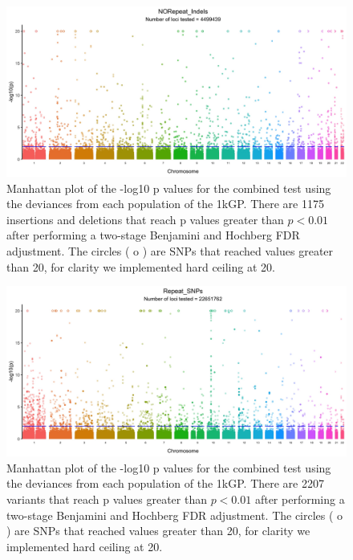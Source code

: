 \documentclass[9pt,lineno]{elife}
\begin{document}
\begin{figure}[h]
\includegraphics[width=\hsize,keepaspectratio]{./Figures/ManhattanPlot_NORepeat_Indels.jpg}

\caption{Manhattan plot of the -log10 p values for the combined test using the deviances from each population of the 1kGP. 
There are 1175 insertions and deletions that reach p values greater than $ p < 0.01$ after performing a two-stage Benjamini and Hochberg FDR adjustment. 
The circles ( o ) are SNPs that reached values greater than 20, for clarity we implemented hard ceiling at 20.}
 \label{NRI_Manhattan}
\end{figure}

\begin{figure}[h]
\includegraphics[width=\hsize,keepaspectratio]{./Figures/ManhattanPlot_Repeat_SNPs.jpg}

\caption{Manhattan plot of the -log10 p values for the combined test using the deviances from each population of the 1kGP. 
There are 2207 variants that reach p values greater than $ p < 0.01$ after performing a two-stage Benjamini and Hochberg FDR adjustment. 
The circles ( o ) are SNPs that reached values greater than 20, for clarity we implemented hard ceiling at 20.}
\label{RS_Manhattan}
\end{figure}
\end{document}
